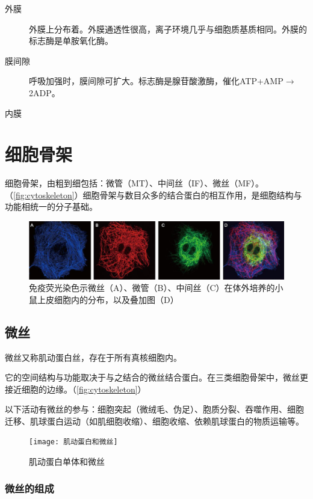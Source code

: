 \begin{description}
	\item[外膜] 外膜上分布着。外膜通透性很高，离子环境几乎与细胞质基质相同。外膜的标志酶是单胺氧化酶。
	\item[膜间隙] 呼吸加强时，膜间隙可扩大。标志酶是腺苷酸激酶，催化ATP+AMP$\longrightarrow$2ADP。
	\item[内膜]
\end{description}

\section{细胞骨架}

细胞骨架，由粗到细包括：微管（MT）、中间丝（IF）、微丝（MF）。（\autoref{fig:cytoskeleton}）细胞骨架与数目众多的结合蛋白的相互作用，是细胞结构与功能相统一的分子基础。

\begin{figure}[h]
	\centering
	\includegraphics[width=0.9\linewidth]{Pics/cytoskeleton}
	\caption{免疫荧光染色示微丝（A）、微管（B）、中间丝（C）在体外培养的小鼠上皮细胞内的分布，以及叠加图（D）}
	\label{fig:cytoskeleton}
\end{figure}


\subsection{微丝}

微丝又称肌动蛋白丝，存在于所有真核细胞内。

它的空间结构与功能取决于与之结合的微丝结合蛋白。在三类细胞骨架中，微丝更接近细胞的边缘。（\autoref{fig:cytoskeleton}）

以下活动有微丝的参与：细胞突起（微绒毛、伪足）、胞质分裂、吞噬作用、细胞迁移、肌球蛋白运动（如肌细胞收缩）、细胞收缩、依赖肌球蛋白的物质运输等。

\begin{figure}[htbp]
	\centering
	\texttt{[image: 肌动蛋白和微丝]}
	\caption{肌动蛋白单体和微丝}
	\label{fig:actin_microfibre}
\end{figure}

\subsubsection{微丝的组成}

